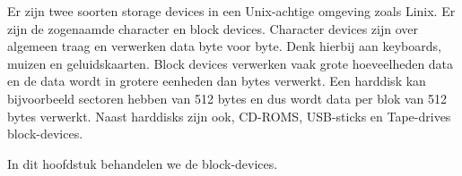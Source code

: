 Er zijn twee soorten storage devices in een Unix-achtige omgeving zoals Linix. Er zijn de zogenaamde character en block devices. Character devices zijn over algemeen traag en verwerken data byte voor byte. Denk hierbij aan keyboards, muizen en geluidskaarten. Block devices verwerken vaak grote hoeveelheden data en de data wordt in grotere eenheden dan bytes verwerkt. Een harddisk kan bijvoorbeeld sectoren hebben van 512 bytes en dus wordt data per blok van 512 bytes verwerkt. Naast harddisks zijn ook, CD-ROMS, USB-sticks en Tape-drives block-devices.

In dit hoofdstuk behandelen we de block-devices.

